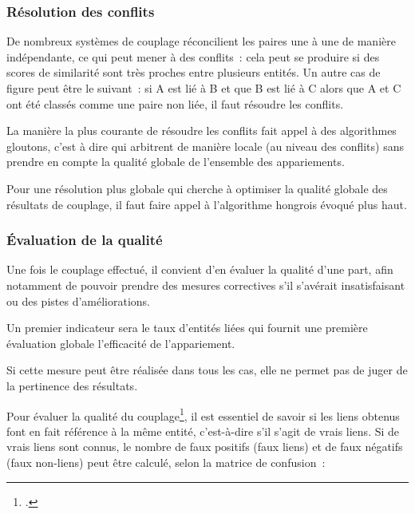 \documentclass[a4paper,12pt,twoside]{book}
\begin{document}
			    \subsubsection{Résolution des conflits}
			    
			    De nombreux systèmes de couplage réconcilient les paires une à une de manière indépendante, ce qui peut mener à des conflits~: cela peut se produire si des scores de similarité sont très proches entre plusieurs entités. Un autre cas de figure peut être le suivant~: si A est lié à B et que B est lié à C alors que A et C ont été classés comme une paire non liée, il faut résoudre les conflits.
			    
			    La manière la plus courante de résoudre les conflits fait appel à des algorithmes \og{}gloutons\fg{}, c'est à dire qui arbitrent de manière locale (au niveau des conflits) sans prendre en compte la qualité globale de l'ensemble des appariements.
			    
			    Pour une résolution plus globale qui cherche à optimiser la qualité globale des résultats de couplage, il faut faire appel à l'algorithme hongrois évoqué plus haut.
			    
			    \subsubsection{Évaluation de la qualité}
			    
			    Une fois le couplage effectué, il convient d'en évaluer la qualité d'une part, afin notamment de pouvoir prendre des mesures correctives s'il s'avérait insatisfaisant ou des pistes d'améliorations.
			    
			    Un premier indicateur sera le taux d'entités liées qui fournit une première évaluation globale l'efficacité de l'appariement.
			    
			    Si cette mesure peut être réalisée dans tous les cas, elle ne permet pas de juger de la pertinence des résultats.
			    \pagebreak

			    Pour évaluer la qualité du couplage\footcite[][pp.~163-184]{christenDataMatchingConcepts2012}, il est essentiel de savoir si les liens obtenus font en fait référence à la même entité, c'est-à-dire s'il s'agit de vrais liens. Si de vrais liens sont connus, le nombre de faux positifs (faux liens) et de faux négatifs (faux non-liens) peut être calculé, selon la \og{}matrice de confusion\fg{}~:
			    
\end{document}
